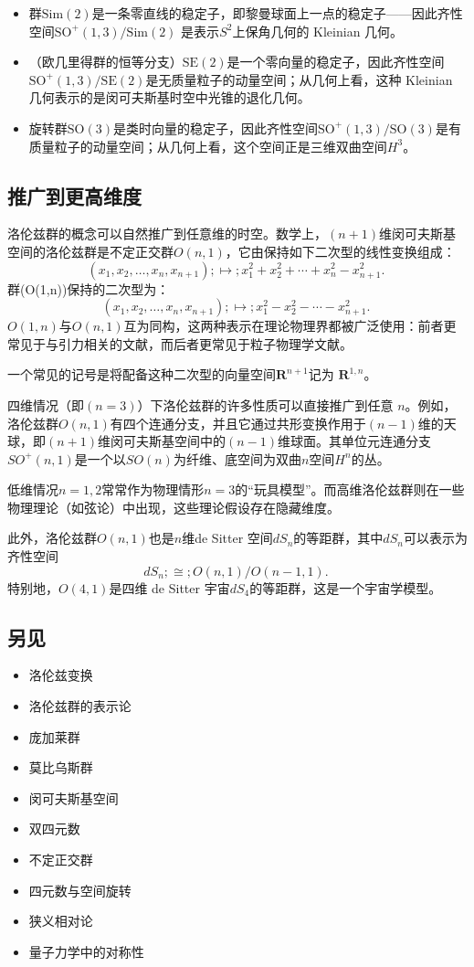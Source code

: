 \begin{itemize}
\item 群$\mathrm{Sim}(2)$是一条零直线的稳定子，即黎曼球面上一点的稳定子——因此齐性空间$\mathrm{SO}^{+}(1,3) / \mathrm{Sim}(2)$ 是表示$S^{2}$上保角几何的 Kleinian 几何。  
\item （欧几里得群的恒等分支）$\mathrm{SE}(2)$是一个零向量的稳定子，因此齐性空间$\mathrm{SO}^{+}(1,3) / \mathrm{SE}(2)$是无质量粒子的动量空间；从几何上看，这种 Kleinian 几何表示的是闵可夫斯基时空中光锥的退化几何。  
\item 旋转群$\mathrm{SO}(3)$是类时向量的稳定子，因此齐性空间$\mathrm{SO}^{+}(1,3) / \mathrm{SO}(3)$是有质量粒子的动量空间；从几何上看，这个空间正是三维双曲空间$H^{3}$。
\end{itemize}
\subsection{推广到更高维度}
洛伦兹群的概念可以自然推广到任意维的时空。数学上，$(n+1)$维闵可夫斯基空间的洛伦兹群是不定正交群$O(n,1)$，它由保持如下二次型的线性变换组成：
$$
(x_{1},x_{2},\ldots ,x_{n},x_{n+1}) ;\mapsto; x_{1}^{2}+x_{2}^{2}+\cdots +x_{n}^{2}-x_{n+1}^{2}.~
$$
群(O(1,n))保持的二次型为：
$$
(x_{1},x_{2},\ldots ,x_{n},x_{n+1}) ;\mapsto; x_{1}^{2}-x_{2}^{2}-\cdots -x_{n+1}^{2}.~
$$
$O(1,n)$与$O(n,1)$互为同构，这两种表示在理论物理界都被广泛使用：前者更常见于与引力相关的文献，而后者更常见于粒子物理学文献。

一个常见的记号是将配备这种二次型的向量空间$\mathbf{R}^{n+1}$记为 $\mathbf{R}^{1,n}$。

四维情况（即$(n=3)$）下洛伦兹群的许多性质可以直接推广到任意 $n$。例如，洛伦兹群$O(n,1)$有四个连通分支，并且它通过共形变换作用于$(n-1)$维的天球，即$(n+1)$维闵可夫斯基空间中的$(n-1)$维球面。其单位元连通分支$SO^{+}(n,1)$是一个以$SO(n)$为纤维、底空间为双曲$n$空间$H^{n}$的丛。

低维情况$n=1,2$常常作为物理情形$n=3$的“玩具模型”。而高维洛伦兹群则在一些物理理论（如弦论）中出现，这些理论假设存在隐藏维度。

此外，洛伦兹群$O(n,1)$也是$n$维de Sitter 空间$dS_{n}$的等距群，其中$dS_{n}$可以表示为齐性空间
$$
dS_{n} ;\cong; O(n,1)/O(n-1,1).~
$$
特别地，$O(4,1)$是四维 de Sitter 宇宙$dS_{4}$的等距群，这是一个宇宙学模型。
\subsection{另见}
\begin{itemize}
\item 洛伦兹变换
\item 洛伦兹群的表示论
\item 庞加莱群
\item 莫比乌斯群
\item 闵可夫斯基空间
\item 双四元数
\item 不定正交群
\item 四元数与空间旋转
\item 狭义相对论
\item 量子力学中的对称性
\end{itemize}
